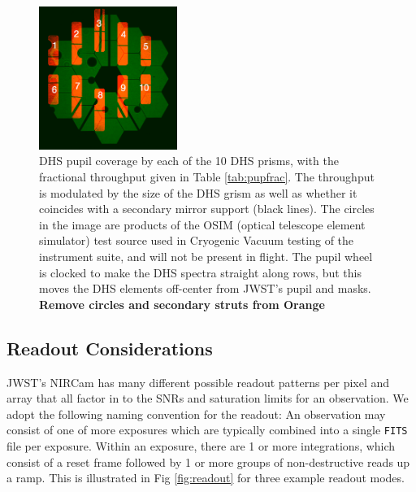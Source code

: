 \documentclass[iop]{emulateapj}
\begin{document}
\begin{figure}
\centering
\includegraphics[width=0.4\textwidth]{dhs_pupil_overlay.png}
\caption{DHS pupil coverage by each of the 10 DHS prisms, with the fractional throughput given in Table \ref{tab:pupfrac}. 
The throughput is modulated by the size of the DHS grism as well as whether it coincides with a secondary mirror support (black lines).
The circles in the image are products of the OSIM (optical telescope element simulator) test source used in Cryogenic Vacuum testing of the instrument suite, and will not be present in flight.
The pupil wheel is clocked to make the DHS spectra straight along rows, but this moves the DHS elements off-center from JWST's pupil and masks.
\textbf{Remove circles and secondary struts from Orange}}\label{fig:DHSvsPupilOverlay}
\end{figure}

\subsection{Readout Considerations}\label{sec:readout}
JWST's NIRCam has many different possible readout patterns per pixel and array that all factor in to the SNRs and saturation limits for an observation.
We adopt the following naming convention for the readout: An observation may consist of one of more exposures which are typically combined into a single \texttt{FITS} file per exposure.
Within an exposure, there are 1 or more integrations, which consist of a reset frame followed by 1 or more groups of non-destructive reads up a ramp.
This is illustrated in Fig \ref{fig:readout} for three example readout modes.
\end{document}
